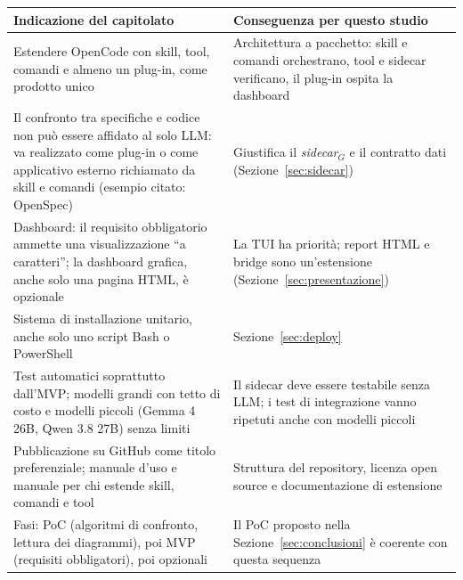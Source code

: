 \documentclass[a4paper, 11pt]{article}
\newcommand{\term}[1]{\textit{#1}$_G$} %
\begin{document}
\vspace{0.3cm}
\noindent
\begin{tabularx}{\textwidth}{|X|X|}
    \hline
    \textbf{Indicazione del capitolato} & \textbf{Conseguenza per questo studio} \\ \hline
    Estendere OpenCode con skill, tool, comandi e almeno un plug-in, come prodotto unico & Architettura a pacchetto: skill e comandi orchestrano, tool e sidecar verificano, il plug-in ospita la dashboard \\ \hline
    Il confronto tra specifiche e codice non può essere affidato al solo LLM: va realizzato come plug-in o come applicativo esterno richiamato da skill e comandi (esempio citato: OpenSpec) & Giustifica il \term{sidecar} e il contratto dati (Sezione~\ref{sec:sidecar}) \\ \hline
    Dashboard: il requisito obbligatorio ammette una visualizzazione ``a caratteri''; la dashboard grafica, anche solo una pagina HTML, è opzionale & La TUI ha priorità; report HTML e bridge sono un'estensione (Sezione~\ref{sec:presentazione}) \\ \hline
    Sistema di installazione unitario, anche solo uno script Bash o PowerShell & Sezione~\ref{sec:deploy} \\ \hline
    Test automatici soprattutto dall'MVP; modelli grandi con tetto di costo e modelli piccoli (Gemma 4 26B, Qwen 3.8 27B) senza limiti & Il sidecar deve essere testabile senza LLM; i test di integrazione vanno ripetuti anche con modelli piccoli \\ \hline
    Pubblicazione su GitHub come titolo preferenziale; manuale d'uso e manuale per chi estende skill, comandi e tool & Struttura del repository, licenza open source e documentazione di estensione \\ \hline
    Fasi: PoC (algoritmi di confronto, lettura dei diagrammi), poi MVP (requisiti obbligatori), poi opzionali & Il PoC proposto nella Sezione~\ref{sec:conclusioni} è coerente con questa sequenza \\ \hline
\end{tabularx}
\vspace{0.3cm}
\end{document}

